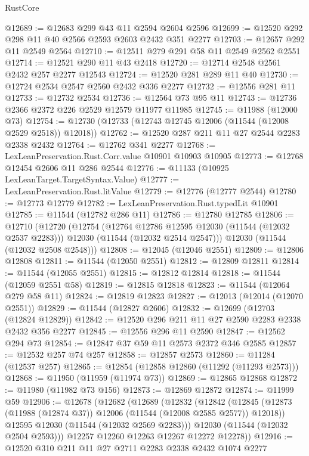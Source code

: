 \begin{lexlean}{RustCore}
\begin{coremodule}
@12689 := @12683 @299 @43 @11 @2594 @2604 @2596
@12699 := @12520 @292 @298 @11 @40 @2566 @2593 @2603 @2432 @351 @2277
@12703 := @12657 @292 @11 @2549 @2564
@12710 := @12511 @279 @291 @58 @11 @2549 @2562 @2551
@12714 := @12521 @290 @11 @43 @2418
@12720 := @12714 @2548 @2561 @2432 @257 @2277 @12543
@12724 := @12520 @281 @289 @11 @40
@12730 := @12724 @2534 @2547 @2560 @2432 @336 @2277
@12732 := @12556 @281 @11
@12733 := @12732 @2534
@12736 := @12564 @73 @95 @11
@12743 := @12736 @2366 @2372 @226 @2529 @12579 @11977 @11985
@12745 := @11988 (@12000 @73)
@12754 := @12730 (@12733 (@12743 @12745 @12006 (@11544 (@12008 @2529 @2518)) @12018))
@12762 := @12520 @287 @211 @11 @27 @2544 @2283 @2338 @2432
@12764 := @12762 @341 @2277
@12768 := LexLeanPreservation.Rust.Corr.value @10901 @10903 @10905
@12773 := @12768 @12454 @2606 @11 @286 @2544
@12776 := @11133 (@10925 LexLeanTarget.TargetSyntax.Value)
@12777 := LexLeanPreservation.Rust.litValue
@12779 := @12776 (@12777 @2544)
@12780 := @12773 @12779
@12782 := LexLeanPreservation.Rust.typedLit @10901
@12785 := @11544 (@12782 @286 @11)
@12786 := @12780 @12785
@12806 := @12710
    (@12720
      (@12754
        (@12764 @12786 @12595 @12030 (@11544 (@12032 @2537 @2283)))
        @12030
        (@11544 (@12032 @2514 @2547)))
      @12030
      (@11544 (@12032 @2508 @2548)))
@12808 := @12045 (@12046 @2551)
@12809 := @12806 @12808
@12811 := @11544 (@12050 @2551)
@12812 := @12809 @12811
@12814 := @11544 (@12055 @2551)
@12815 := @12812 @12814
@12818 := @11544 (@12059 @2551 @58)
@12819 := @12815 @12818
@12823 := @11544 (@12064 @279 @58 @11)
@12824 := @12819 @12823
@12827 := @12013 (@12014 (@12070 @2551))
@12829 := @11544 (@12827 @2606)
@12832 := @12699 (@12703 (@12824 @12829))
@12842 := @12520 @296 @211 @11 @27 @2590 @2283 @2338 @2432 @356 @2277
@12845 := @12556 @296 @11 @2590
@12847 := @12562 @294 @73
@12854 := @12847 @37 @59 @11 @2573 @2372 @346 @2585
@12857 := @12532 @257 @74 @257
@12858 := @12857 @2573
@12860 := @11284 (@12537 @257)
@12865 := @12854 (@12858 @12860 (@11292 (@11293 @2573)))
@12868 := @11950 (@11959 (@11974 @73))
@12869 := @12865 @12868
@12872 := @11980 (@11982 @73 @156)
@12873 := @12869 @12872
@12874 := @11999 @59
@12906 := @12678
    (@12682
      (@12689
        (@12832
          (@12842
            (@12845 (@12873 (@11988 (@12874 @37)) @12006 (@11544 (@12008 @2585 @2577)) @12018))
            @12595
            @12030
            (@11544 (@12032 @2569 @2283)))
          @12030
          (@11544 (@12032 @2504 @2593)))
        @12257
        @12260
        @12263
        @12267
        @12272
        @12278))
@12916 := @12520 @310 @211 @11 @27 @2711 @2283 @2338 @2432 @1074 @2277

\end{coremodule}
\end{lexlean}
